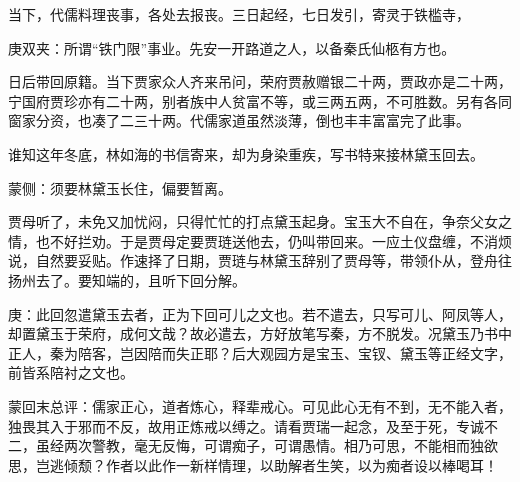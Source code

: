 \begin{parag}
    当下，代儒料理丧事，各处去报丧。三日起经，七日发引，寄灵于铁槛寺，\begin{note}庚双夹：所谓“铁门限”事业。先安一开路道之人，以备秦氏仙柩有方也。\end{note}日后带回原籍。当下贾家众人齐来吊问，荣府贾赦赠银二十两，贾政亦是二十两，宁国府贾珍亦有二十两，别者族中人贫富不等，或三两五两，不可胜数。另有各同窗家分资，也凑了二三十两。代儒家道虽然淡薄，倒也丰丰富富完了此事。
\end{parag}


\begin{parag}
    谁知这年冬底，林如海的书信寄来，却为身染重疾，写书特来接林黛玉回去。\begin{note}蒙侧：须要林黛玉长住，偏要暂离。\end{note}贾母听了，未免又加忧闷，只得忙忙的打点黛玉起身。宝玉大不自在，争奈父女之情，也不好拦劝。于是贾母定要贾琏送他去，仍叫带回来。一应土仪盘缠，不消烦说，自然要妥贴。作速择了日期，贾琏与林黛玉辞别了贾母等，带领仆从，登舟往扬州去了。要知端的，且听下回分解。
\end{parag}


\begin{parag}
    \begin{note}庚：此回忽遣黛玉去者，正为下回可儿之文也。若不遣去，只写可儿、阿凤等人，却置黛玉于荣府，成何文哉？故必遣去，方好放笔写秦，方不脱发。况黛玉乃书中正人，秦为陪客，岂因陪而失正耶？后大观园方是宝玉、宝钗、黛玉等正经文字，前皆系陪衬之文也。\end{note}
\end{parag}


\begin{parag}
    \begin{note}蒙回末总评：儒家正心，道者炼心，释辈戒心。可见此心无有不到，无不能入者，独畏其入于邪而不反，故用正炼戒以缚之。请看贾瑞一起念，及至于死，专诚不二，虽经两次警教，毫无反悔，可谓痴子，可谓愚情。相乃可思，不能相而独欲思，岂逃倾颓？作者以此作一新样情理，以助解者生笑，以为痴者设以棒喝耳！\end{note}
\end{parag}